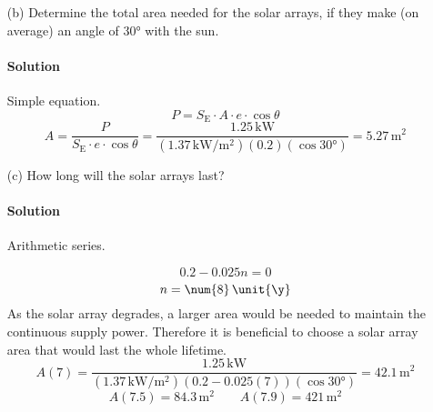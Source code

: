 \documentclass{article}
\begin{document}
{\begin{enumerate}
		\paragraph{Solution} To get the total energy needed from the batteries during the eclipse, we need to find how long the satellite is eclipsed by the Earth.
		
		\[
			\theta = \arcsin(\frac{R_\mathrm{E}}{R_\mathrm{E} + h}) = \arcsin(\frac{\kRadiusEarth}{(\kRadiusEarth) + (\num{500e3} \, \unit{\meter})}) = \ang{68}
		\]
		\[
			\text{Time spent eclipsed} = \frac{2\theta}{\ang{360}} \cdot T_\mathrm{orbit}
		\]
		\[
			T_\mathrm{orbit} = \sqrt{ \frac{4\pi^2}{GM} a^3 } = \sqrt{\frac{4\pi^2}{GM} (\num{6871e3} \, \unit{\meter})^3} = \num{5670} \, \unit{\second}
		\]
		\[
			\text{Time spent eclipsed} = \frac{2(\ang{68})}{\ang{360}} \cdot (\num{5670} \, \unit{\second}) = \num{2142} \, \unit{\second}
		\]
		\[
			\text{Energy needed during eclipse } = P \cdot t = (\num{1.25} \, \unit{\kilo\watt})(\num{2142} \, \unit{\second}) = \num{2.68e6} \, \unit{\joule}
		\] \\
		
		\item[(b)] Determine the total area needed for the solar arrays, if they make (on average) an angle of $\ang{30}$ with the sun. \\
		\paragraph{Solution} Simple equation.
		\[
			P = S_\mathrm{E} \cdot A \cdot e \cdot \cos \theta
		\]
		\[
			A = \frac{P}{S_\mathrm{E} \cdot e \cdot \cos \theta} = \frac{\num{1.25} \, \unit{\kilo\watt}}{(\num{1.37} \, \unit{\kilo\watt\per\meter\squared})(0.2)(\cos \ang{30})} = \num{5.27} \, \unit{\meter\squared}
		\]
		
		\item[(c)] How long will the solar arrays last? \\
		\paragraph{Solution} Arithmetic series.
		
		\[
			0.2 - 0.025n = 0
		\]
		\[
			n = \num{8} \, \unit{\y}
		\]
		As the solar array degrades, a larger area would be needed to maintain the continuous supply power. Therefore it is beneficial to choose a solar array area that would last the whole lifetime.
		\[
			A(7) = \frac{\num{1.25} \, \unit{\kilo\watt}}{(\num{1.37} \, \unit{\kilo\watt\per\meter\squared})(0.2 - 0.025(7))(\cos \ang{30})} = \num{42.1} \, \unit{\meter\squared}
		\]
		\[
			A(7.5) = \num{84.3} \, \unit{\meter\squared} \qquad A(7.9) = \num{421} \, \unit{\meter\squared}
		\]
		

\end{enumerate}}
\end{document}

